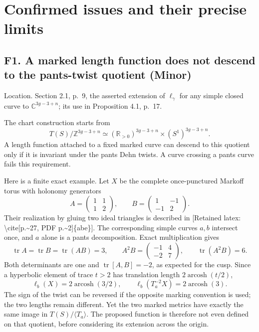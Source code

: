 \documentclass[10pt]{article}
\begin{document}
\section*{Confirmed issues and their precise limits}
\subsection*{F1. A marked length function does not descend to the pants-twist quotient (Minor)}
Location. Section 2.1, p. 9, the asserted extension of \(\ell_\gamma\) for any simple closed curve to \(\mathbb C^{3g-3+n}\); its use in Proposition 4.1, p. 17.\par
The chart construction starts from \[T(S)/\mathbb Z^{3g-3+n}\simeq
 (\mathbb R_{>0})^{3g-3+n}\times(S^1)^{3g-3+n}.\] A length function attached to a fixed marked curve can descend to this quotient only if it is invariant under the pants Dehn twists. A curve crossing a pants curve fails this requirement.\par
Here is a finite exact example. Let \(X\) be the complete once-punctured Markoff torus with holonomy generators \[A=\begin{pmatrix}1&1\\1&2\end{pmatrix},
 \qquad B=\begin{pmatrix}1&-1\\-1&2\end{pmatrix}.\] Their realization by gluing two ideal triangles is described in [Retained latex: \textbackslash{}cite[p.\textasciitilde{}27, PDF p.\textasciitilde{}2]\{abe\}]. The corresponding simple curves \(a,b\) intersect once, and \(a\) alone is a pants decomposition. Exact multiplication gives \[\operatorname{tr}A=\operatorname{tr}B=\operatorname{tr}(AB)=3,\qquad
 A^2B=\begin{pmatrix}-1&4\\-2&7\end{pmatrix},
 \qquad \operatorname{tr}(A^2B)=6.\] Both determinants are one and \(\operatorname{tr}[A,B]=-2\), as expected for the cusp. Since a hyperbolic element of trace \(t>2\) has translation length \(2\operatorname{arcosh}(t/2)\), \[\ell_b(X)=2\operatorname{arcosh}(3/2),\qquad
 \ell_b(T_a^{-2}X)=2\operatorname{arcosh}(3).\] The sign of the twist can be reversed if the opposite marking convention is used; the two lengths remain different. Yet the two marked metrics have exactly the same image in \(T(S)/\langle T_a\rangle\). The proposed function is therefore not even defined on that quotient, before considering its extension across the origin.\par
\end{document}
